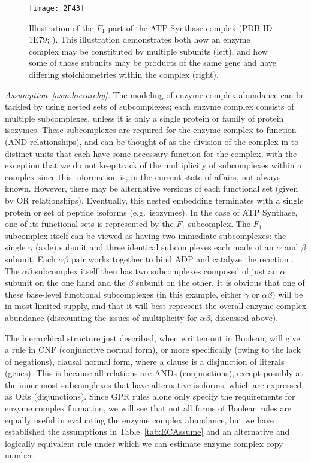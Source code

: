 \begin{figure*}%
\centering
\texttt{[image: 2F43]}
\caption{Illustration of the $F_1$ part of the ATP Synthase complex
  (PDB ID 1E79; \citealt{Gibbons2000,Bernstein1978,Gezelter}).
  This illustration demonstrates both how an enzyme complex may be
  constituted by multiple subunits (left), and how some of those
  subunits may be products of the same gene and have differing
  stoichiometries within the complex (right).}
\label{fig:2F43}
\end{figure*}

\emph{Assumption~\ref{asm:hierarchy}.}
The modeling of enzyme complex abundance can be tackled by using
nested sets of subcomplexes; each enzyme complex consists of multiple
subcomplexes, unless it is only a single protein or family of protein
isozymes.  These subcomplexes are required for the enzyme complex to
function (AND relationships), and can be thought of as the division of
the complex in to distinct units that each have some necessary
function for the complex, with the exception that we do not keep track
of the multiplicity of subcomplexes within a complex since this
information is, in the current state of affairs, not always known.
However, there may be alternative versions of each functional set
(given by OR relationships). Eventually, this nested embedding
terminates with a single protein or set of peptide isoforms
(e.g.\ isozymes).  In the case of ATP Synthase, one of its functional
sets is represented by the $F_1$ subcomplex. The $F_1$ subcomplex
itself can be viewed as having two immediate subcomplexes: the single
$\gamma$ (axle) subunit and three identical subcomplexes each made of
an $\alpha$ and $\beta$ subunit. Each $\alpha\beta$ pair works
together to bind ADP and catalyze the reaction \citep{Oster2003}. The
$\alpha\beta$ subcomplex itself then has two subcomplexes composed of
just an $\alpha$ subunit on the one hand and the $\beta$ subunit on
the other.  It is obvious that one of these base-level functional
subcomplexes (in this example, either $\gamma$ or $\alpha\beta$) will
be in most limited supply, and that it will best represent the overall
enzyme complex abundance (discounting the issues of multiplicity for
$\alpha\beta$, discussed above).

%
%

The hierarchical structure just described, when written out in
Boolean, will give a rule in CNF (conjunctive normal form), or more
specifically (owing to the lack of negations), clausal normal form,
where a clause is a disjunction of literals (genes). This is because all
relations are ANDs (conjunctions), except possibly at the inner-most
subcomplexes that have alternative isoforms, which are expressed as
ORs (disjunctions). Since GPR rules alone only specify the
requirements for enzyme complex formation, we will see that not all
forms of Boolean rules are equally useful in evaluating the enzyme
complex abundance, but we have established the assumptions in
Table~\ref{tab:ECAssume} and an alternative and logically equivalent rule
\citep{Russell2009} under which we can estimate enzyme complex copy
number.

